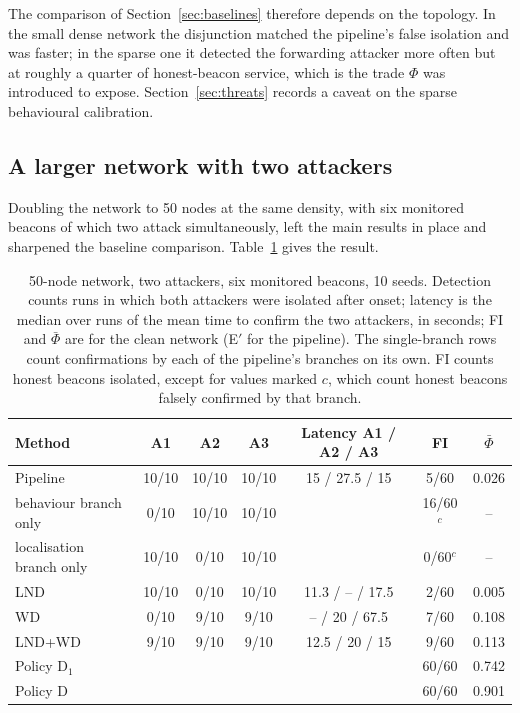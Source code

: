 The comparison of Section~\ref{sec:baselines} therefore depends on the
topology. In the small dense network the disjunction matched the pipeline's
false isolation and was faster; in the sparse one it detected the forwarding
attacker more often but at roughly a quarter of honest-beacon service, which
is the trade $\Phi$ was introduced to expose. Section~\ref{sec:threats}
records a caveat on the sparse behavioural calibration.

\subsection{A larger network with two attackers}
\label{sec:scale}

Doubling the network to 50 nodes at the same density, with six monitored
beacons of which two attack simultaneously, left the main results in place
and sharpened the baseline comparison. Table~\ref{tab:scale} gives the
result.

\begin{table}[!t]
\caption{50-node network, two attackers, six monitored beacons, 10 seeds.
Detection counts runs in which both attackers were isolated after onset;
latency is the median over runs of the mean time to confirm the two
attackers, in seconds; FI and $\bar\Phi$ are for the clean network (E$'$ for
the pipeline). The single-branch rows count confirmations by each of the
pipeline's branches on its own. FI counts honest beacons isolated, except for
values marked $c$, which count honest beacons falsely confirmed by that
branch.}
\label{tab:scale}
\centering
\small
\setlength{\tabcolsep}{4pt}
\begin{tabular}{@{}lcccccc@{}}
\toprule
Method & A1 & A2 & A3 & Latency A1 / A2 / A3 & FI & $\bar\Phi$ \\
\midrule
Pipeline & 10/10 & 10/10 & 10/10 & 15 / 27.5 / 15 & 5/60 & 0.026 \\
\quad behaviour branch only & 0/10 & 10/10 & 10/10 & & 16/60$^{c}$ & -- \\
\quad localisation branch only & 10/10 & 0/10 & 10/10 & & 0/60$^{c}$ & -- \\
LND & 10/10 & 0/10 & 10/10 & 11.3 / -- / 17.5 & 2/60 & 0.005 \\
WD & 0/10 & 9/10 & 9/10 & -- / 20 / 67.5 & 7/60 & 0.108 \\
LND+WD & 9/10 & 9/10 & 9/10 & 12.5 / 20 / 15 & 9/60 & 0.113 \\
Policy D$_1$ & & & & & 60/60 & 0.742 \\
Policy D & & & & & 60/60 & 0.901 \\
\bottomrule
\end{tabular}
\end{table}

